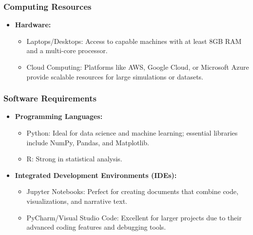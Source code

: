 \documentclass{beamer}
\begin{document}
\begin{frame}[fragile]
    \frametitle{Computing Resources}
    \begin{itemize}
        \item \textbf{Hardware:}
        \begin{itemize}
            \item Laptops/Desktops: Access to capable machines with at least 8GB RAM and a multi-core processor.
            \item Cloud Computing: Platforms like AWS, Google Cloud, or Microsoft Azure provide scalable resources for large simulations or datasets.
        \end{itemize}
    \end{itemize}
\end{frame}

\begin{frame}[fragile]
    \frametitle{Software Requirements}
    \begin{itemize}
        \item \textbf{Programming Languages:}
        \begin{itemize}
            \item Python: Ideal for data science and machine learning; essential libraries include NumPy, Pandas, and Matplotlib.
            \item R: Strong in statistical analysis.
        \end{itemize}
        
        \item \textbf{Integrated Development Environments (IDEs):}
        \begin{itemize}
            \item Jupyter Notebooks: Perfect for creating documents that combine code, visualizations, and narrative text.
            \item PyCharm/Visual Studio Code: Excellent for larger projects due to their advanced coding features and debugging tools.
        \end{itemize}
    \end{itemize}
\end{frame}
\end{document}
